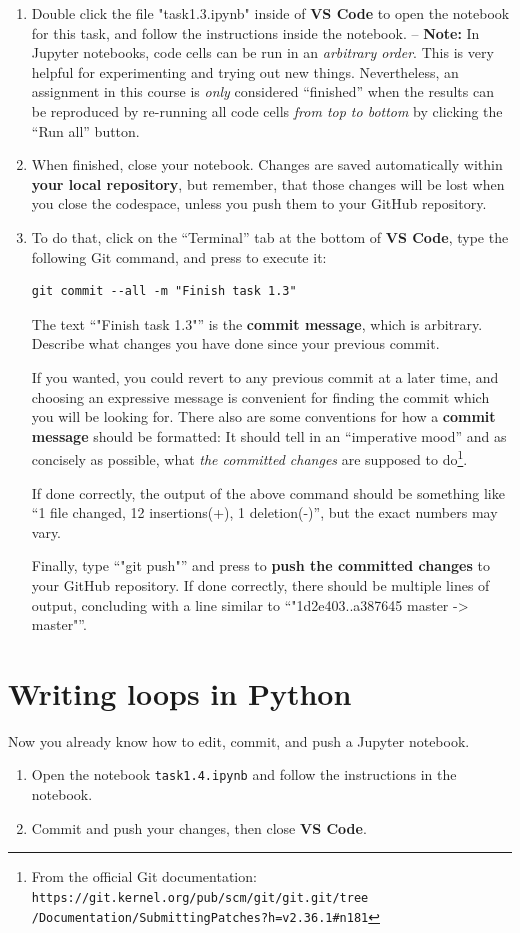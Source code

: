 \documentclass[12pt,a4paper]{article}
\begin{document}
\begin{enumerate}
\item Double click the file "task1.3.ipynb" inside of \textbf{VS Code} to open the notebook for this task, and follow the instructions inside the notebook. -- \textbf{Note:} In Jupyter notebooks, code cells can be run in an \emph{arbitrary order}. This is very helpful for experimenting and trying out new things. Nevertheless, an assignment in this course is \emph{only} considered ``finished'' when the results can be reproduced by re-running all code cells \emph{from top to bottom} by clicking the ``Run all'' button.
\item When finished, close your notebook. Changes are saved automatically within \textbf{your local repository}, but remember, that those changes will be lost when you close the codespace, unless you push them to your GitHub repository.
\item To do that, click on the ``Terminal'' tab at the bottom of \textbf{VS Code}, type the following Git command, and press \Return to execute it:
\begin{Verbatim}[frame=single]
git commit --all -m "Finish task 1.3"
\end{Verbatim}
The text ``"Finish task 1.3"'' is the \textbf{commit message}, which is arbitrary. Describe what changes you have done since your previous commit.

If you wanted, you could revert to any previous commit at a later time, and choosing an expressive message is convenient for finding the commit which you will be looking for. There also are some conventions for how a \textbf{commit message} should be formatted: It should tell in an ``imperative mood'' and as concisely as possible, what \emph{the committed changes} are supposed to do\footnote{From the official Git documentation: \texttt{https://git.kernel.org/pub/scm/git/git.git/tree\\/Documentation/SubmittingPatches?h=v2.36.1\#n181}}.

If done correctly, the output of the above command should be something like ``1 file changed, 12 insertions(+), 1 deletion(-)'', but the exact numbers may vary.

Finally, type ``"git push"'' and press \Return to \textbf{push the committed changes} to your GitHub repository. If done correctly, there should be multiple lines of output, concluding with a line similar to ``"1d2e403..a387645 master -> master"''.
\end{enumerate}

\section{Writing loops in Python}
Now you already know how to edit, commit, and push a Jupyter notebook.
\begin{enumerate}
    \item Open the notebook \texttt{task1.4.ipynb} and follow the instructions in the notebook.
    \item Commit and push your changes, then close \textbf{VS Code}.
\end{enumerate}
\end{document}
